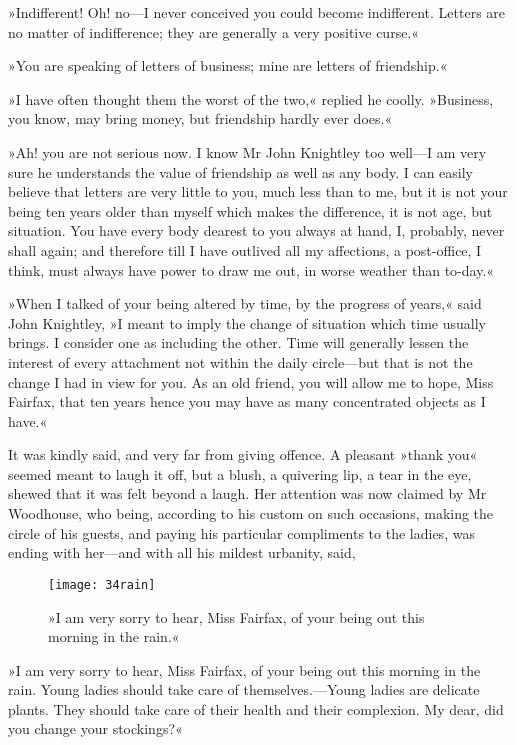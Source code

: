 »Indifferent! Oh! no—I never conceived you could become indifferent. Letters are no matter of indifference; they are generally a very positive curse.«

»You are speaking of letters of business; mine are letters of friendship.«

»I have often thought them the worst of the two,« replied he coolly. »Business, you know, may bring money, but friendship hardly ever does.«

»Ah! you are not serious now. I know Mr John Knightley too well—I am very sure he understands the value of friendship as well as any body. I can easily believe that letters are very little to you, much less than to me, but it is not your being ten years older than myself which makes the difference, it is not age, but situation. You have every body dearest to you always at hand, I, probably, never shall again; and therefore till I have outlived all my affections, a post-office, I think, must always have power to draw me out, in worse weather than to-day.«

»When I talked of your being altered by time, by the progress of years,« said John Knightley, »I meant to imply the change of situation which time usually brings. I consider one as including the other. Time will generally lessen the interest of every attachment not within the daily circle—but that is not the change I had in view for you. As an old friend, you will allow me to hope, Miss Fairfax, that ten years hence you may have as many concentrated objects as I have.«

It was kindly said, and very far from giving offence. A pleasant »thank you« seemed meant to laugh it off, but a blush, a quivering lip, a tear in the eye, shewed that it was felt beyond a laugh. Her attention was now claimed by Mr Woodhouse, who being, according to his custom on such occasions, making the circle of his guests, and paying his particular compliments to the ladies, was ending with her—and with all his mildest urbanity, said,

\begin{figure}[tbph]
\centering
\texttt{[image: 34rain]}
\caption{»I am very sorry to hear, Miss Fairfax, of your being out this morning in the rain.«}
\end{figure}

»I am very sorry to hear, Miss Fairfax, of your being out this morning in the rain. Young ladies should take care of themselves.—Young ladies are delicate plants. They should take care of their health and their complexion. My dear, did you change your stockings?«

